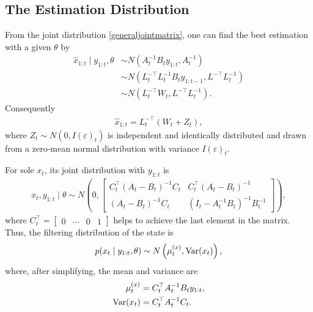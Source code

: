 \subsection{The Estimation Distribution}\label{generalEstDistr}

From the joint distribution \eqref{generaljointmatrix}, one can find the best estimation with a given $\theta$ by
\begin{align*}
\hat{x}_{1:t} \mid y_{1:t},\theta &\sim N \left( A_{t}^{-1}B_{t}y_{1:t}, A_{t}^{-1} \right) \\
&\sim N(L_t^{-\top}L_t^{-1}B_{t}y_{1:t-1},L^{-\top}L_t^{-1})\\
&\sim N(L_t^{-\top}W_t,L^{-\top}L_t^{-1}).
\end{align*}
Consequently 
\begin{align*}
\hat{x}_{1:t} = L_t^{-\top}(W_t+Z_t),
\end{align*}
where $Z_t \sim N(0, I(\varepsilon)_{t})$ is independent and identically distributed and drawn from a zero-mean normal distribution with variance $I(\varepsilon)_{t}$. 

For sole $x_{t}$, its joint distribution with $y_{1:t}$ is 
\begin{align*}
x_{t}, y_{1:t}\mid \theta \sim N\left( 0, \begin{bmatrix}
C_{t}^\top(A_{t}-B_{t}) ^{-1}C_{t} & C_{t}^\top (A_{t}-B_{t})^{-1}\\
(A_{t}-B_{t})^{-1}C_{t} & (I_t- A_{t}^{-1}B_{t}) ^{-1}B_{t}^{-1}
\end{bmatrix} \right),
\end{align*}
where $C_t^\top = \begin{bmatrix}0 & \cdots & 0 & 1\end{bmatrix}$ helps to  achieve the last element in the matrix. Thus, the filtering distribution of the state is 
\begin{align*}
p(x_{t}\mid y_{1:t},\theta) \sim N\left( \mu_{t}^{(x)},\mathrm{Var}(x_{t}) \right),
\end{align*}
where, after simplifying, the mean and variance are  
\begin{align}\label{generalmux}
\mu_{t}^{(x)} & = C_{t}^\top A_{t}^{-1}B_{t}y_{1:t} ,\\
\mathrm{Var}(x_{t})& =C_{t}^\top A_{t}^{-1}C_{t}. \label{generalSigx}
\end{align}

